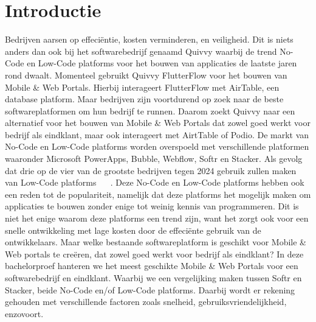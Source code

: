 
\section{Introductie}%
\label{sec:introductie}

Bedrijven aarsen op effeciëntie, kosten  verminderen, en veiligheid. Dit is niets anders dan ook bij het softwarebedrijf genaamd Quivvy waarbij de trend No-Code en Low-Code
platforms voor het bouwen van applicaties de laatste jaren rond dwaalt. Momenteel gebruikt Quivvy FlutterFlow voor het bouwen van Mobile \& Web Portals. 
Hierbij interageert FlutterFlow met AirTable, een database platform. Maar bedrijven zijn voortdurend op zoek naar de beste softwareplatformen om hun bedrijf te runnen.
Daarom zoekt Quivvy naar een alternatief voor het bouwen van Mobile \& Web Portals dat zowel goed werkt voor bedrijf als eindklant, maar ook interageert met AirtTable of Podio.
De markt van No-Code en Low-Code platforms worden overspoeld met verschillende platformen waaronder Microsoft PowerApps, Bubble, Webflow, Softr en Stacker.
Als gevolg dat drie op de vier van de grootste bedrijven tegen 2024 gebruik zullen maken van Low-Code platforms ~\autocite{Moskal_2021} ~\autocite{Kulkarni_2021}.
Deze No-Code en Low-Code platforms hebben ook een reden tot de populariteit, namelijk dat
deze platforms het mogelijk maken om applicaties te bouwen zonder enige tot weinig kennis van programmeren. Dit is niet het enige waarom deze platforms een trend zijn,
want het zorgt ook voor een snelle ontwikkeling met lage kosten door de effeciënte gebruik van de ontwikkelaars.
Maar welke bestaande softwareplatform is geschikt voor Mobile \& Web portals te creëren, dat zowel goed werkt voor bedrijf als eindklant?
In deze bachelorproef hanteren we het meest geschikte Mobile \& Web Portals voor een softwarebedrijf en eindklant.
Waarbij we een vergelijking maken tussen Softr en Stacker, beide No-Code en/of Low-Code platforms. Daarbij wordt er rekening gehouden met verschillende 
factoren zoals snelheid, gebruiksvriendelijkheid, enzovoort.




